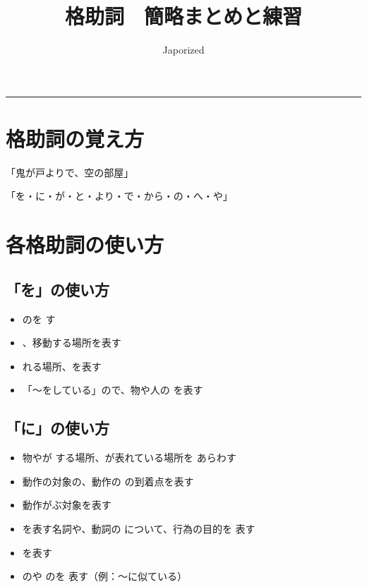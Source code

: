\documentclass{tufte-handout}
\title{格助詞　簡略まとめと練習}
\author{Japorized}
\makeatletter
\renewcommand{\maketitle}{%
\thispagestyle{empty}
\noindent
{\Huge\@title\unskip\strut\par}
\noindent
{\small\@author\unskip\strut\par}

\vspace{0.5cm}
\hrule
\vspace{1.5cm}
}
\makeatother
\begin{document}
\maketitle
\nocite{etsuko}
\nocite{tkforeignlang}

\section{格助詞の覚え方}%
\label{sec:kakujoshinooboekata}

「鬼が戸よりで、空の部屋」

\noindent
「を・に・が・と・より・で・から・の・へ・や」


\section{各格助詞の使い方}%
\label{sec:kakukakujoshinotsukaikata}

\subsection{「を」の使い方}%
\label{sub:wo_notsukaikata}

\begin{itemize}
  \item {}のを
    す
  \item {}、移動する場所を表す
  \item {}れる場所、を表す
  \item 「〜をしている」ので、物や人の
    を表す
\end{itemize}


\subsection{「に」の使い方}%
\label{sub:ni_notsukaikata}

\begin{itemize}
  \item 物やが
    する場所、が表れている場所を
    あらわす
  \item 動作の対象の、動作の
    の到着点を表す
  \item 動作がぶ対象を表す
  \item {}を表す名詞や、動詞の
    について、行為の目的を
    表す
  \item {}を表す
  \item {}のや
    のを
    表す（例：〜に似ている）
\end{itemize}
\end{document}
